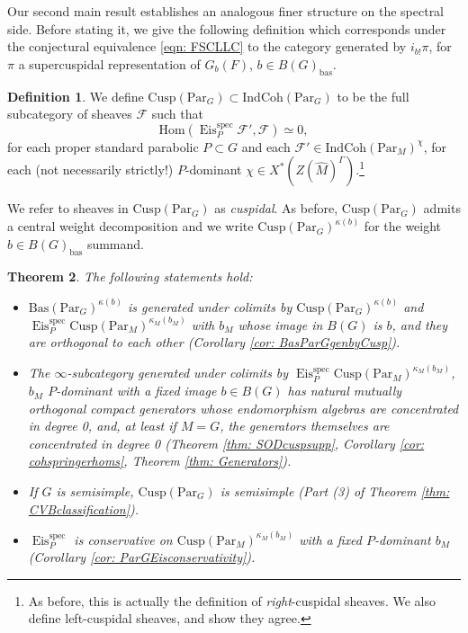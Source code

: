 \documentclass{amsart}
\newtheorem{theorem}{Theorem}[subsection]
\theoremstyle{definition}
\newtheorem{definition}[theorem]{Definition}
\theoremstyle{remark}
\numberwithin{equation}{section}
\newcommand{\mc}{\mathcal}
\newcommand{\bas}{\mathrm{bas}}
\newcommand{\Hom}{\mathrm{Hom}}
\newcommand{\spec}{\mathrm{spec}}
\newcommand{\wh}{\widehat}
\newcommand{\Par}{\mathrm{Par}}
\newcommand{\IndCoh}{\mathrm{IndCoh}}
\DeclareMathOperator{\Eis}{\mathrm{Eis}}
\newcommand{\Cusp}{\mathrm{Cusp}}
\newcommand{\Bas}{\mathrm{Bas}}
\begin{document}
Our second main result establishes an analogous finer structure on the spectral side. Before stating it, we give the following definition which corresponds under the conjectural equivalence \eqref{eqn: FSCLLC} to the category generated by $i_{b!}\pi$, for $\pi$ a supercuspidal representation of $G_b(F)$, $b\in B(G)_{\bas}$.
\begin{definition}\label{def: IntroCusp}
       We define $\Cusp(\Par_G) \subset \IndCoh(\Par_G)$ to be the full subcategory of sheaves $\mc{F}$ such that
    \begin{equation*}
       \Hom(\Eis^{\spec}_{P} \mc{F}', \mc{F})\simeq 0,
       \end{equation*}
       for each proper standard parabolic $P \subset G$ and each $\mc{F}' \in \IndCoh(\Par_M)^{\chi}$, for each (not necessarily strictly!) $P$-dominant $\chi \in X^*(Z(\wh{M})^{\Gamma})$.\footnote{As before, this is actually the definition of \emph{right}-cuspidal sheaves. We also define left-cuspidal sheaves, and show they agree.}

       We refer to sheaves in $\Cusp(\Par_G)$ as \emph{cuspidal}. As before, $\Cusp(\Par_G)$ admits a central weight decomposition and we write $\Cusp(\Par_G)^{\kappa(b)}$ for the weight $b\in B(G)_\bas$ summand. 
\end{definition}

\begin{theorem}\label{thm:IntroII}
The following statements hold:
\begin{itemize}
    \item $\Bas(\Par_G)^{\kappa(b)}$ is generated under colimits by $\Cusp (\Par_G)^{\kappa(b)}$ and $\Eis^\spec_P \Cusp (\Par_M)^{\kappa_M(b_M)}$ with $b_M$ whose image in $B(G)$ is $b$, and they are orthogonal to each other (Corollary \ref{cor: BasParGgenbyCusp}).
    \item The $\infty$-subcategory generated under colimits by $\Eis^\spec_P \Cusp(\Par_M)^{\kappa_M(b_M)}$, $b_M$ $P$-dominant with a fixed image $b\in B(G)$ has natural mutually orthogonal compact generators whose endomorphism algebras are concentrated in degree 0, and,
    at least if $M=G$, the generators themselves are concentrated in degree 0  (Theorem \ref{thm: SODcuspsupp}, Corollary \ref{cor: cohspringerhoms}, Theorem \ref{thm: Generators}).
    \item If $G$ is semisimple, $\Cusp(\Par_G)$ is semisimple (Part (3) of Theorem \ref{thm: CVBclassification}).
    \item $\Eis^\spec_P$ is conservative on $\Cusp(\Par_M)^{\kappa_M(b_M)}$ with a fixed $P$-dominant $b_M$ (Corollary \ref{cor: ParGEisconservativity}). 
\end{itemize}
\end{theorem}
\end{document}
